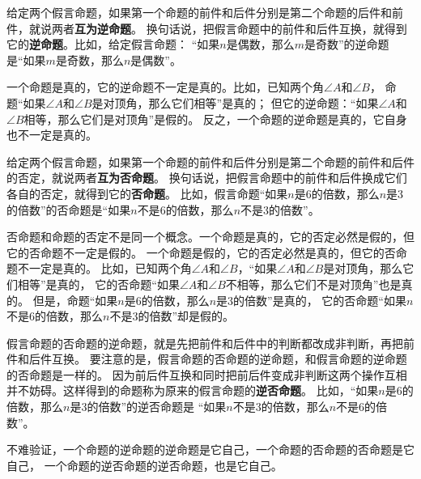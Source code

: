 \documentclass[12pt,UTF8]{ctexbook}
\begin{document}
给定两个假言命题，如果第一个命题的前件和后件分别是第二个命题的后件和前件，就说两者\textbf{互为逆命题}。
换句话说，把假言命题中的前件和后件互换，就得到它的\textbf{逆命题}。比如，给定假言命题：
“如果$n$是偶数，那么$m$是奇数”的逆命题是“如果$m$是奇数，那么$n$是偶数”。

一个命题是真的，它的逆命题不一定是真的。比如，已知两个角$\angle A$和$\angle B$，
命题“如果$\angle A$和$\angle B$是对顶角，那么它们相等”是真的；
但它的逆命题：“如果$\angle A$和$\angle B$相等，那么它们是对顶角”是假的。
反之，一个命题的逆命题是真的，它自身也不一定是真的。

给定两个假言命题，如果第一个命题的前件和后件分别是第二个命题的前件和后件的否定，就说两者\textbf{互为否命题}。
换句话说，把假言命题中的前件和后件换成它们各自的否定，就得到它的\textbf{否命题}。
比如，假言命题“如果$n$是$6$的倍数，那么$n$是$3$的倍数”的否命题是“如果$n$不是$6$的倍数，那么$n$不是$3$的倍数”。

否命题和命题的否定不是同一个概念。一个命题是真的，它的否定必然是假的，但它的否命题不一定是假的。
一个命题是假的，它的否定必然是真的，但它的否命题不一定是真的。
比如，已知两个角$\angle A$和$\angle B$，“如果$\angle A$和$\angle B$是对顶角，那么它们相等”是真的，
它的否命题“如果$\angle A$和$\angle B$不相等，那么它们不是对顶角”也是真的。
但是，命题“如果$n$是$6$的倍数，那么$n$是$3$的倍数”是真的，
它的否命题“如果$n$不是$6$的倍数，那么$n$不是$3$的倍数”却是假的。

假言命题的否命题的逆命题，就是先把前件和后件中的判断都改成非判断，再把前件和后件互换。
要注意的是，假言命题的否命题的逆命题，和假言命题的逆命题的否命题是一样的。
因为前后件互换和同时把前后件变成非判断这两个操作互相并不妨碍。这样得到的命题称为原来的假言命题的\textbf{逆否命题}。
比如，“如果$n$是$6$的倍数，那么$n$是$3$的倍数”的逆否命题是
“如果$n$不是$3$的倍数，那么$n$不是$6$的倍数”。

不难验证，一个命题的逆命题的逆命题是它自己，一个命题的否命题的否命题是它自己，
一个命题的逆否命题的逆否命题，也是它自己。
\end{document}
